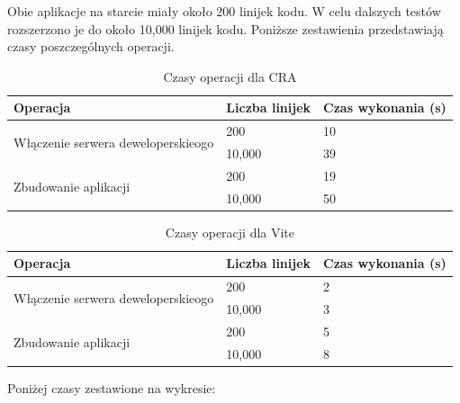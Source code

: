 \documentclass{article}
\begin{document}
Obie aplikacje na starcie miały około 200 linijek kodu. W celu dalszych testów rozszerzono je do około 10,000 linijek kodu. Poniższe zestawienia przedstawiają czasy poszczególnych operacji.

\begin{table}[H]
\centering
\begin{tabular}{|l|l|l|}
\hline
\textbf{Operacja} & \textbf{Liczba linijek} & \textbf{Czas wykonania (s)} \\ \hline
\multirow{2}{*}{Włączenie serwera deweloperskieogo} & 200 & 10 \\ 
& 10,000 & 39 \\ \hline
\multirow{2}{*}{Zbudowanie aplikacji} & 200 & 19 \\ 
& 10,000 & 50 \\ \hline
\end{tabular}
\caption{Czasy operacji dla CRA}
\label{tab:czas_wykonania}
\end{table}

\begin{table}[H]
\centering
\begin{tabular}{|l|l|l|}
\hline
\textbf{Operacja} & \textbf{Liczba linijek} & \textbf{Czas wykonania (s)} \\ \hline
\multirow{2}{*}{Włączenie serwera deweloperskieogo} & 200 & 2 \\ 
& 10,000 & 3 \\ \hline
\multirow{2}{*}{Zbudowanie aplikacji} & 200 & 5 \\ 
& 10,000 & 8 \\ \hline
\end{tabular}
\caption{Czasy operacji dla Vite}
\label{tab:czas_wykonania}
\end{table}


Poniżej czasy zestawione na wykresie:
\end{document}
